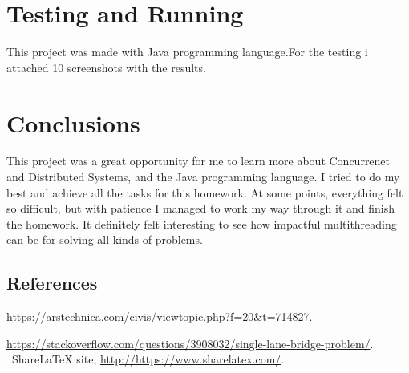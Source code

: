 \documentclass{article}
\begin{document}
\section{Testing and Running}
This project was made with Java programming language.For the testing i attached 10 screenshots with the results.
\section{Conclusions}
This project was a great opportunity for me to learn more about Concurrenet and Distributed Systems, and the Java programming language. I tried to do my best and achieve all the tasks for this homework. At some points, everything felt so difficult, but with patience I managed to work my way through it and finish the homework. It definitely felt interesting to see how impactful multithreading can be for solving all kinds of problems.





\pagebreak
\subsection{References}
\begin{thebibliography}{9}

	  \url{https://arstechnica.com/civis/viewtopic.php?f=20&t=714827}.

	  \url{https://stackoverflow.com/questions/3908032/single-lane-bridge-problem/}.
     \ ShareLaTeX site,
     \url{http://https://www.sharelatex.com/}.

\end{thebibliography}
\end{document}
